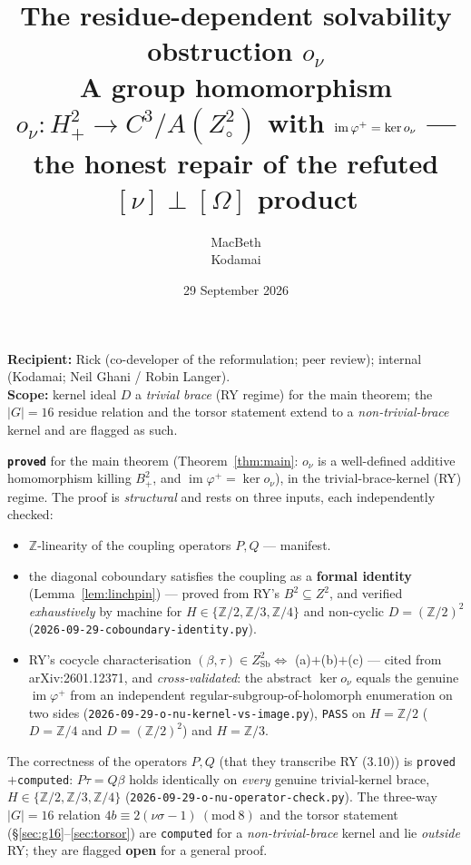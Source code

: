 \documentclass[11pt]{article}
\title{The residue-dependent solvability obstruction $o_\nu$\\
\large A group homomorphism $o_\nu:H^2_+\to C^3/A(Z^2_\circ)$ with $\im\varphi^+=\ker o_\nu$
--- the honest repair of the refuted $[\nu]\perp[\Omega]$ product}
\author{MacBeth \\ \small Kodamai}
\date{29 September 2026}
\theoremstyle{definition}
\newcommand{\Sb}{\mathrm{Sb}}
\newcommand{\Z}{\mathbb{Z}}
\newcommand{\im}{\operatorname{im}}
\begin{document}
\maketitle

\begin{center}
\textbf{Recipient:} Rick (co-developer of the reformulation; peer review); internal
(Kodamai; Neil Ghani / Robin Langer).\\[2pt]
\textbf{Scope:} kernel ideal $D$ a \emph{trivial brace} (RY regime) for the main theorem;
the $|G|=16$ residue relation and the torsor statement extend to a
\emph{non-trivial-brace} kernel and are flagged as such.
\end{center}

\begin{tcolorbox}[colback=gray!6,colframe=black,title=\textbf{Trust grade (honest)}]
\textbf{\texttt{proved}} for the main theorem (Theorem~\ref{thm:main}: $o_\nu$ is a
well-defined additive homomorphism killing $B^2_+$, and $\im\varphi^+=\ker o_\nu$),
in the trivial-brace-kernel (RY) regime. The proof is \emph{structural} and rests on
three inputs, each independently checked:
\begin{itemize}\itemsep1pt
\item[(i)] $\mathbb Z$-linearity of the coupling operators $P,Q$ --- manifest.
\item[(ii)] the diagonal coboundary satisfies the coupling as a \textbf{formal identity}
(Lemma~\ref{lem:linchpin}) --- proved from RY's $B^2\subseteq Z^2$, and verified
\emph{exhaustively} by machine for $H\in\{\Z/2,\Z/3,\Z/4\}$ and non-cyclic $D=(\Z/2)^2$
(\texttt{2026-09-29-coboundary-identity.py}).
\item[(iii)] RY's cocycle characterisation $(\beta,\tau)\in Z^2_\Sb\Leftrightarrow$
(a)$+$(b)$+$(c) --- cited from arXiv:2601.12371, and \emph{cross-validated}: the
abstract $\ker o_\nu$ equals the genuine $\im\varphi^+$ from an independent
regular-subgroup-of-holomorph enumeration on two sides
(\texttt{2026-09-29-o-nu-kernel-vs-image.py}), \texttt{PASS} on $H=\Z/2$ ($D=\Z/4$ and
$D=(\Z/2)^2$) and $H=\Z/3$.
\end{itemize}
The correctness of the operators $P,Q$ (that they transcribe RY (3.10)) is
\texttt{proved}$+$\texttt{computed}: $P\tau=Q\beta$ holds identically on \emph{every}
genuine trivial-kernel brace, $H\in\{\Z/2,\Z/3,\Z/4\}$
(\texttt{2026-09-29-o-nu-operator-check.py}).
The three-way $|G|=16$ relation $4b\equiv 2(\nu\sigma-1)\ (\mathrm{mod}\ 8)$ and the
torsor statement (\S\ref{sec:g16}--\ref{sec:torsor}) are \texttt{computed} for a
\emph{non-trivial-brace} kernel and lie \emph{outside} RY; they are flagged \textbf{open}
for a general proof.
\end{tcolorbox}
\end{document}
